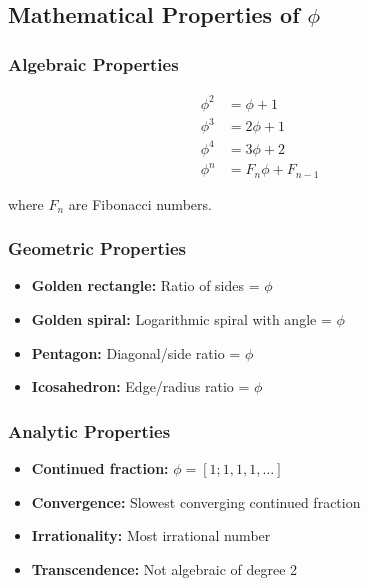 \documentclass[11pt]{article}
\theoremstyle{definition}
\newcommand{\goldenratio}{\phi}
\begin{document}
\subsection{Mathematical Properties of $\goldenratio$}

\subsubsection{Algebraic Properties}

\begin{align}
\goldenratio^2 &= \goldenratio + 1 \\
\goldenratio^3 &= 2\goldenratio + 1 \\
\goldenratio^4 &= 3\goldenratio + 2 \\
\goldenratio^n &= F_n \goldenratio + F_{n-1}
\end{align}

where $F_n$ are Fibonacci numbers.

\subsubsection{Geometric Properties}

\begin{itemize}
\item \textbf{Golden rectangle:} Ratio of sides = $\goldenratio$
\item \textbf{Golden spiral:} Logarithmic spiral with angle = $\goldenratio$
\item \textbf{Pentagon:} Diagonal/side ratio = $\goldenratio$
\item \textbf{Icosahedron:} Edge/radius ratio = $\goldenratio$
\end{itemize}

\subsubsection{Analytic Properties}

\begin{itemize}
\item \textbf{Continued fraction:} $\goldenratio = [1; 1, 1, 1, \ldots]$
\item \textbf{Convergence:} Slowest converging continued fraction
\item \textbf{Irrationality:} Most irrational number
\item \textbf{Transcendence:} Not algebraic of degree 2
\end{itemize}
\end{document}
